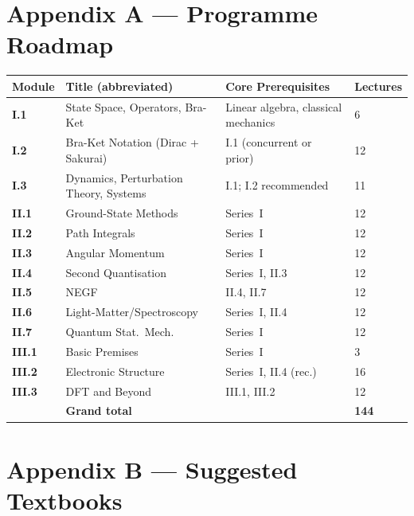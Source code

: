 \documentclass[11pt,a4paper]{article}
\begin{document}
\newpage
\section*{Appendix A --- Programme Roadmap}

\begin{center}
\begin{tabular}{@{}llll@{}}
\toprule
\textbf{Module} & \textbf{Title (abbreviated)} & \textbf{Core Prerequisites} & \textbf{Lectures}\\
\midrule
\textbf{I.1} & State Space, Operators, Bra-Ket & Linear algebra, classical mechanics & 6\\
\textbf{I.2} & Bra-Ket Notation (Dirac + Sakurai) & I.1 (concurrent or prior) & 12\\
\textbf{I.3} & Dynamics, Perturbation Theory, Systems & I.1; I.2 recommended & 11\\
\midrule
\textbf{II.1} & Ground-State Methods & Series~I & 12\\
\textbf{II.2} & Path Integrals & Series~I & 12\\
\textbf{II.3} & Angular Momentum & Series~I & 12\\
\textbf{II.4} & Second Quantisation & Series~I, II.3 & 12\\
\textbf{II.5} & NEGF & II.4, II.7 & 12\\
\textbf{II.6} & Light-Matter/Spectroscopy & Series~I, II.4 & 12\\
\textbf{II.7} & Quantum Stat.\ Mech. & Series~I & 12\\
\midrule
\textbf{III.1} & Basic Premises & Series~I & 3\\
\textbf{III.2} & Electronic Structure & Series~I, II.4 (rec.) & 16\\
\textbf{III.3} & DFT and Beyond & III.1, III.2 & 12\\
\midrule
 & \textbf{Grand total} & & \textbf{144}\\
\bottomrule
\end{tabular}
\end{center}

\section*{Appendix B --- Suggested Textbooks}
\end{document}
